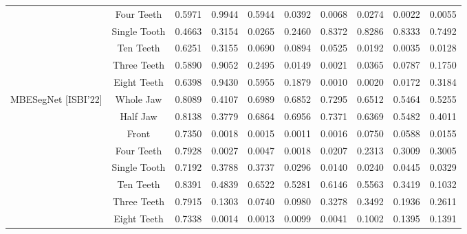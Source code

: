 \documentclass[letterpaper, 10 pt, conference]{ieeeconf}  %
\begin{document}
\begin{table*}[htbp]
\begin{tabular}{|c|c|c|c|c |c |c |c |c |c|}
& Four Teeth & 0.5971 & 0.9944 & 0.5944 & 0.0392 & 0.0068 & 0.0274 & 0.0022 & 0.0055\\
&  Single Tooth & 0.4663 & 0.3154 & 0.0265 & 0.2460 & 0.8372 &  0.8286 & 0.8333 & 0.7492\\
& Ten Teeth & 0.6251& 0.3155& 0.0690& 0.0894& 0.0525& 0.0192& 0.0035& 0.0128\\
& Three Teeth & 0.5890& 0.9052& 0.2495& 0.0149& 0.0021& 0.0365& 0.0787& 0.1750\\
& Eight Teeth & 0.6398& 0.9430& 0.5955& 0.1879& 0.0010& 0.0020& 0.0172& 0.3184\\
\hline
{MBESegNet [ISBI'22]}  & Whole Jaw & 0.8089 & 0.4107 & 0.6989 & 0.6852 & 0.7295 & 0.6512 & 0.5464 & 0.5255 \\
& Half Jaw & 0.8138 & 0.3779 & 0.6864 & 0.6956 & 0.7371 & 0.6369 & 0.5482 & 0.4011\\
& Front & 0.7350 & 0.0018 & 0.0015 & 0.0011 & 0.0016 & 0.0750 & 0.0588 & 0.0155 \\
& Four Teeth & 0.7928 & 0.0027 & 0.0047 & 0.0018 & 0.0207 & 0.2313 & 0.3009 & 0.3005\\
& Single Tooth & 0.7192 & 0.3788 & 0.3737 & 0.0296 & 0.0140 & 0.0240 & 0.0445 & 0.0329\\
& Ten Teeth & 0.8391& 0.4839& 0.6522& 0.5281& 0.6146& 0.5563& 0.3419& 0.1032\\
& Three Teeth & 0.7915& 0.1303& 0.0740& 0.0980& 0.3278& 0.3492& 0.1936& 0.2611\\
& Eight Teeth & 0.7338& 0.0014& 0.0013& 0.0099& 0.0041& 0.1002& 0.1395& 0.1391\\
\hline
\end{tabular}

\label{tab:toothres2}
\end{table*}
\end{document}
